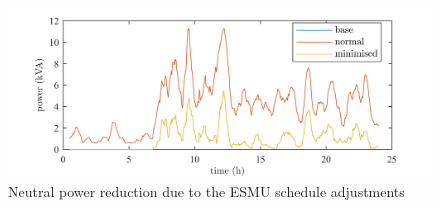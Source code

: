\begin{figure}\centering
	\includegraphics[width=\textwidth]{_chapter1/fig/ts-neutral-power-2}
\caption{Neutral power reduction due to the ESMU schedule adjustments}
\label{ch1:fig:ts-neutral-power}
\end{figure}